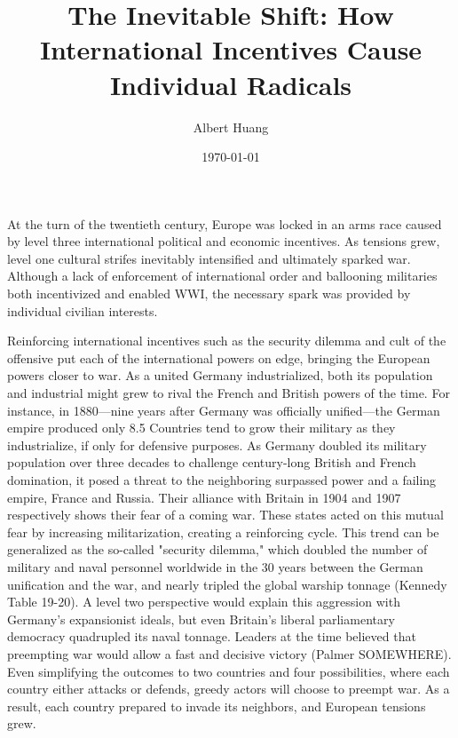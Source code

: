 \documentclass[11pt]{article}
\author{Albert Huang}
\date{\today}
\title{The Inevitable Shift: How International Incentives Cause Individual Radicals}
\begin{document}
\maketitle
\tableofcontents

\usepackage{setspace}
\setlength\parindent{30pt}

  \begin{doublespacing}

 At the turn of the twentieth century, Europe was locked in an arms race caused by level three international political and economic incentives. As tensions grew, level one cultural strifes inevitably intensified and ultimately sparked war.
 Although a lack of enforcement of international order and ballooning militaries both incentivized and enabled WWI, the necessary spark was provided by individual civilian interests.

 Reinforcing international incentives such as the security dilemma and cult of the offensive put each of the international powers on edge, bringing the European powers closer to war.
 As a united Germany industrialized, both its population and industrial might grew to rival the French and British powers of the time. For instance, in 1880—nine years after Germany was officially unified—the German empire produced only 8.5%
 Countries tend to grow their military as they industrialize, if only for defensive purposes. As Germany doubled its military population over three decades to challenge century-long British and French domination, it posed a threat to the neighboring surpassed power and a failing empire, France and Russia. Their alliance with Britain in 1904 and 1907 respectively shows their fear of a coming war. These states acted on this mutual fear by increasing militarization, creating a reinforcing cycle.
  This trend can be generalized as the so-called "security dilemma," which doubled the number of military and naval personnel worldwide in the 30 years between the German unification and the war, and nearly tripled the global warship tonnage (Kennedy Table 19-20). A level two perspective would explain this aggression with Germany's expansionist ideals, but even Britain's liberal parliamentary democracy quadrupled its naval tonnage.
  Leaders at the time believed that preempting war would allow a fast and decisive victory (Palmer SOMEWHERE). Even simplifying the outcomes to two countries and four possibilities, where each country either attacks or defends, greedy actors will choose to preempt war. As a result, each country prepared to invade its neighbors, and European tensions grew.

\end{doublespacing}
\end{document}
